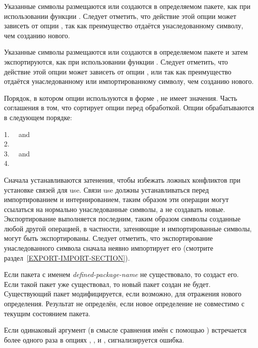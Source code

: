 \begin{defmac}
\begin{flushdesc}
\item[\cd{(:intern \Mstar\emph{symbol-name})}]
Указанные символы размещаются или создаются в определяемом пакете, как
при использовании функции . Следует отметить, что действие этой
опции может зависеть от опции , так как преимущество отдаётся
унаследованному символу, чем созданию нового.

\item[\cd{(:export \Mstar\emph{symbol-name})}]
Указанные символы размещаются или создаются в определяемом пакете и затем
экспортируются, как при использовании функции . Следует отметить,
что действие этой опции может зависеть от опции ,  или
 так как преимущество отдаётся  
унаследованному или импортированному символу, чем созданию нового.
\end{flushdesc}

Порядок, в котором опции используются в форме , не имеет
значения. Часть соглашения в том, что  сортирует опции перед
обработкой.
Опции обрабатываются в следующем порядке:
\begin{tabbing}
1.~~ and  \\
2.~~ \\
3.~~ and  \\
4.~~
\end{tabbing}
Сначала устанавливаются затенения, чтобы избежать ложных конфликтов при
установке связей для use. Связи use должны устанавливаться перед импортированием
и интернированием, таким образом эти операции могут ссылаться на нормально
унаследованные символы, а не создавать новые. Экспортирование выполняется
последним, таким образом символы созданные любой другой операцией, в частности,
затеняющие и импортированные символы, могут быть экспортированы. Следует
отметить, что экспортирование унаследованного символа сначала неявно импортирует
его (смотрите раздел~\ref{EXPORT-IMPORT-SECTION}).

Если пакета с именем \emph{defined-package-name} не существовало, то
 создаст его. Если такой пакет уже существовал, то новый пакет
создан не будет. Существующий пакет модифицируется, если возможно, для отражения
нового определения. Результат не определён, если новое определение не совместимо
с текущим состоянием пакета.

Если одинаковый аргумент  (в смысле сравнения имён с помощью
) встречается более одного раза в опциях ,
,  и , сигнализируется
ошибка.


\end{defmac}
